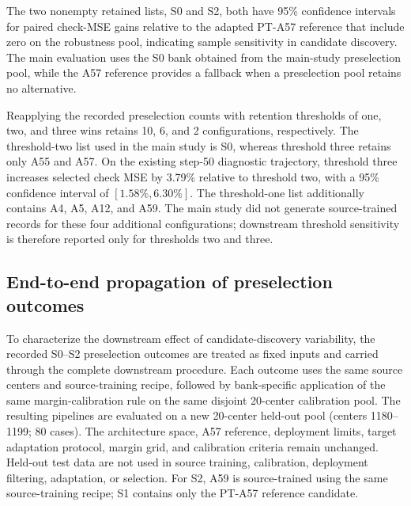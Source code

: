 \documentclass[11pt,a4paper]{article}
\begin{document}
The two nonempty retained lists, S0 and S2, both have 95\% confidence
intervals for paired check-MSE gains relative to the adapted PT-A57 reference
that include zero on the robustness pool, indicating sample sensitivity in
candidate discovery. The main evaluation uses the S0 bank obtained from the
main-study preselection pool, while the A57 reference provides a fallback when a
preselection pool retains no alternative.

Reapplying the recorded preselection counts with retention thresholds of one,
two, and three wins retains 10, 6, and 2 configurations, respectively. The threshold-two list used in the main study is S0, whereas threshold three retains only A55 and
A57. On the existing step-50 diagnostic trajectory, threshold three increases
selected check MSE by 3.79\% relative to threshold two, with a 95\% confidence
interval of $[1.58\%,6.30\%]$. The threshold-one list additionally contains A4, A5, A12, and A59. The main study did not generate source-trained records for these four
additional configurations; downstream threshold sensitivity is therefore
reported only for thresholds two and three.

\subsection{End-to-end propagation of preselection outcomes}

To characterize the downstream effect of candidate-discovery variability,
the recorded S0--S2 preselection outcomes are treated as fixed inputs and carried
through the complete downstream procedure. Each outcome uses the same source
centers and source-training recipe, followed by bank-specific application of the same margin-calibration rule on the same disjoint 20-center
calibration pool. The resulting pipelines are evaluated on a new 20-center
held-out pool (centers 1180--1199; 80 cases). The architecture space, A57
reference, deployment limits, target adaptation protocol, margin grid, and
calibration criteria remain unchanged. Held-out test data are not used in
source training, calibration, deployment filtering, adaptation, or selection.
For S2, A59 is source-trained using the same source-training recipe; S1
contains only the PT-A57 reference candidate.
\end{document}
